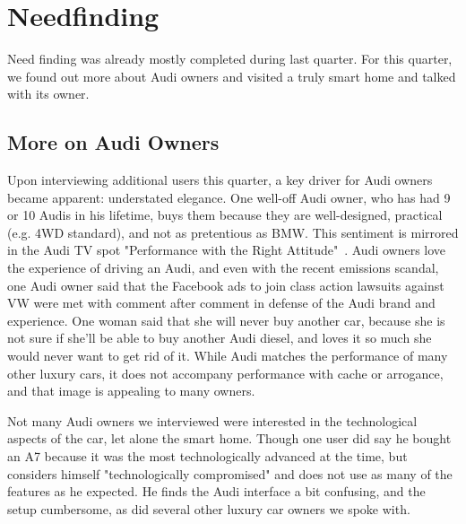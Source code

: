 \section{Needfinding}
\label{sec:needfinding}

Need finding was already mostly completed during last quarter. For this quarter, we found out more about Audi owners and visited a truly smart home and talked with its owner.

\subsection{More on Audi Owners}

Upon interviewing additional users this quarter, a key driver for Audi owners became apparent: understated elegance. One well-off Audi owner, who has had 9 or 10 Audis in his lifetime, buys them because they are well-designed, practical (e.g. 4WD standard), and not as pretentious as BMW. This sentiment is mirrored in the Audi TV spot "Performance with the Right Attitude"~\cite{AudiTVSpotAttitude}. Audi owners love the experience of driving an Audi, and even with the recent emissions scandal, one Audi owner said that the Facebook ads to join class action lawsuits against VW were met with comment after comment in defense of the Audi brand and experience. One woman said that she will never buy another car, because she is not sure if she'll be able to buy another Audi diesel, and loves it so much she would never want to get rid of it. While Audi matches the performance of many other luxury cars, it does not accompany performance with cache or arrogance, and that image is appealing to many owners.

Not many Audi owners we interviewed were interested in the technological aspects of the car, let alone the smart home. Though one user did say he bought an A7 because it was the most technologically advanced at the time, but considers himself "technologically compromised" and does not use as many of the features as he expected. He finds the Audi interface a bit confusing, and the setup cumbersome, as did several other luxury car owners we spoke with.

